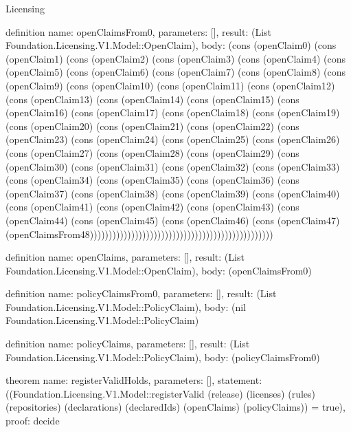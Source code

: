 \begin{lexlean}{Licensing}
\begin{semanticmodule}
definition{
  name: openClaimsFrom0,
  parameters: [],
  result: (List Foundation.Licensing.V1.Model::OpenClaim),
  body: (cons (openClaim0) (cons (openClaim1) (cons (openClaim2) (cons (openClaim3) (cons (openClaim4) (cons (openClaim5) (cons (openClaim6) (cons (openClaim7) (cons (openClaim8) (cons (openClaim9) (cons (openClaim10) (cons (openClaim11) (cons (openClaim12) (cons (openClaim13) (cons (openClaim14) (cons (openClaim15) (cons (openClaim16) (cons (openClaim17) (cons (openClaim18) (cons (openClaim19) (cons (openClaim20) (cons (openClaim21) (cons (openClaim22) (cons (openClaim23) (cons (openClaim24) (cons (openClaim25) (cons (openClaim26) (cons (openClaim27) (cons (openClaim28) (cons (openClaim29) (cons (openClaim30) (cons (openClaim31) (cons (openClaim32) (cons (openClaim33) (cons (openClaim34) (cons (openClaim35) (cons (openClaim36) (cons (openClaim37) (cons (openClaim38) (cons (openClaim39) (cons (openClaim40) (cons (openClaim41) (cons (openClaim42) (cons (openClaim43) (cons (openClaim44) (cons (openClaim45) (cons (openClaim46) (cons (openClaim47) (openClaimsFrom48)))))))))))))))))))))))))))))))))))))))))))))))))
}

definition{
  name: openClaims,
  parameters: [],
  result: (List Foundation.Licensing.V1.Model::OpenClaim),
  body: (openClaimsFrom0)
}

definition{
  name: policyClaimsFrom0,
  parameters: [],
  result: (List Foundation.Licensing.V1.Model::PolicyClaim),
  body: (nil Foundation.Licensing.V1.Model::PolicyClaim)
}

definition{
  name: policyClaims,
  parameters: [],
  result: (List Foundation.Licensing.V1.Model::PolicyClaim),
  body: (policyClaimsFrom0)
}

theorem{
  name: registerValidHolds,
  parameters: [],
  statement: ((Foundation.Licensing.V1.Model::registerValid (release) (licenses) (rules) (repositories) (declarations) (declaredIds) (openClaims) (policyClaims)) = true),
  proof: decide{}
}
\end{semanticmodule}
\end{lexlean}
